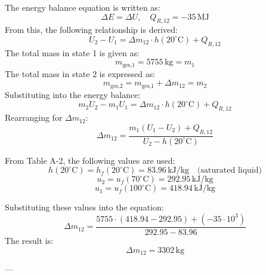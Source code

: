 The energy balance equation is written as:  
\[
\Delta E = \Delta U, \quad Q_{R,12} = -35 \, \text{MJ}
\]  
From this, the following relationship is derived:  
\[
U_2 - U_1 = \Delta m_{12} \cdot h(20^\circ\text{C}) + Q_{R,12}
\]  
The total mass in state 1 is given as:  
\[
m_{\text{ges,1}} = 5755 \, \text{kg} = m_1
\]  
The total mass in state 2 is expressed as:  
\[
m_{\text{ges,2}} = m_{\text{ges,1}} + \Delta m_{12} = m_2
\]  
Substituting into the energy balance:  
\[
m_2 U_2 - m_1 U_1 = \Delta m_{12} \cdot h(20^\circ\text{C}) + Q_{R,12}
\]  
Rearranging for \( \Delta m_{12} \):  
\[
\Delta m_{12} = \frac{m_1 (U_1 - U_2) + Q_{R,12}}{U_2 - h(20^\circ\text{C})}
\]  

From Table A-2, the following values are used:  
\[
h(20^\circ\text{C}) = h_f(20^\circ\text{C}) = 83.96 \, \text{kJ/kg} \quad \text{(saturated liquid)}
\]  
\[
u_2 = u_f(70^\circ\text{C}) = 292.95 \, \text{kJ/kg}
\]  
\[
u_1 = u_f(100^\circ\text{C}) = 418.94 \, \text{kJ/kg}
\]  

Substituting these values into the equation:  
\[
\Delta m_{12} = \frac{5755 \cdot (418.94 - 292.95) + (-35 \cdot 10^3)}{292.95 - 83.96}
\]  
The result is:  
\[
\Delta m_{12} = 3302 \, \text{kg}
\]  

---